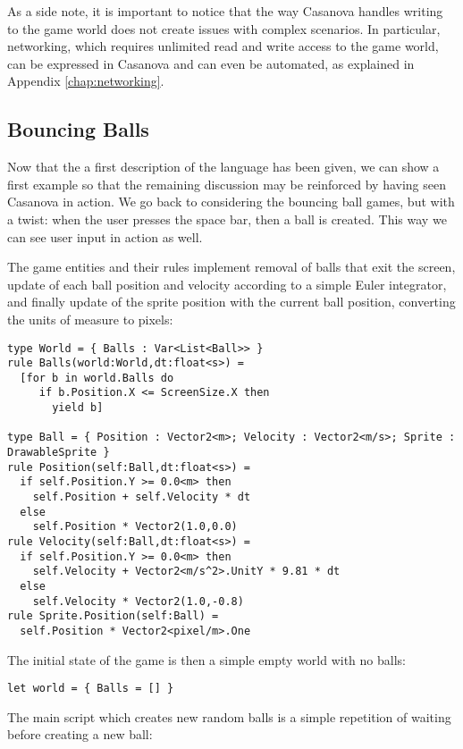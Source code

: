 As a side note, it is important to notice that the way Casanova handles writing to the game world does not create issues with complex scenarios. In particular, networking, which requires unlimited read and write access to the game world, can be expressed in Casanova and can even be automated, as explained in Appendix \ref{chap:networking}.


\subsection{Bouncing Balls}
Now that the a first description of the language has been given, we can show a first example so that the remaining discussion may be reinforced by having seen Casanova in action. We go back to considering the bouncing ball games, but with a twist: when the user presses the space bar, then a ball is created. This way we can see user input in action as well.

The game entities and their rules implement removal of balls that exit the screen, update of each ball position and velocity according to a simple Euler integrator, and finally update of the sprite position with the current ball position, converting the units of measure to pixels:

\begin{lstlisting}
type World = { Balls : Var<List<Ball>> }
rule Balls(world:World,dt:float<s>) = 
  [for b in world.Balls do 
     if b.Position.X <= ScreenSize.X then 
       yield b]

type Ball = { Position : Vector2<m>; Velocity : Vector2<m/s>; Sprite : DrawableSprite }
rule Position(self:Ball,dt:float<s>) =
  if self.Position.Y >= 0.0<m> then 
    self.Position + self.Velocity * dt
  else 
    self.Position * Vector2(1.0,0.0)
rule Velocity(self:Ball,dt:float<s>) =
  if self.Position.Y >= 0.0<m> then 
    self.Velocity + Vector2<m/s^2>.UnitY * 9.81 * dt
  else 
    self.Velocity * Vector2(1.0,-0.8)
rule Sprite.Position(self:Ball) = 
  self.Position * Vector2<pixel/m>.One
\end{lstlisting}

The initial state of the game is then a simple empty world with no balls:

\begin{lstlisting}
let world = { Balls = [] }
\end{lstlisting}

The main script which creates new random balls is a simple repetition of waiting before creating a new ball:

